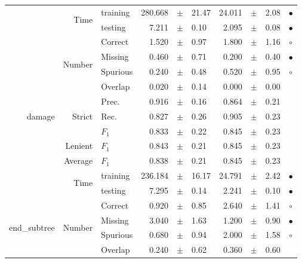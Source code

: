 \begin{longtable}{|r|r|l||rcl|rcl|c|}
\cline{2-10}
 & \multirow{2}{*}{Time} &  training  & 280.668 &  $\pm$  & 21.47 & 24.011 &  $\pm$  & 2.08 &  $\bullet$\\
\cline{3-10}
 &  &  testing  & 7.211 &  $\pm$  & 0.10 & 2.095 &  $\pm$  & 0.08 &  $\bullet$\\
\hline
\hline
\multirow{11}{*}{\begin{sideways}damage\end{sideways} } & \multirow{4}{*}{Number} &  Correct  & 1.520 &  $\pm$  & 0.97 & 1.800 &  $\pm$  & 1.16 &  $\circ$\\
\cline{3-10}
  &  &  Missing  & 0.460 &  $\pm$  & 0.71 & 0.200 &  $\pm$  & 0.40 &  $\bullet$\\
\cline{3-10}
  &  &  Spurious  & 0.240 &  $\pm$  & 0.48 & 0.520 &  $\pm$  & 0.95 &  $\circ$\\
\cline{3-10}
  &  &  Overlap  & 0.020 &  $\pm$  & 0.14 & 0.000 &  $\pm$  & 0.00 &   \\
\cline{2-10}
  & \multirow{3}{*}{Strict} &  Prec.  & 0.916 &  $\pm$  & 0.16 & 0.864 &  $\pm$  & 0.21 &   \\
\cline{3-10}
  &  &  Rec.  & 0.827 &  $\pm$  & 0.26 & 0.905 &  $\pm$  & 0.23 &   \\
\cline{3-10}
  &  &  $F_1$  & 0.833 &  $\pm$  & 0.22 & 0.845 &  $\pm$  & 0.23 &   \\
\cline{2-10}
  & Lenient &  $F_1$  & 0.843 &  $\pm$  & 0.21 & 0.845 &  $\pm$  & 0.23 &   \\
\cline{2-10}
  & Average &  $F_1$  & 0.838 &  $\pm$  & 0.21 & 0.845 &  $\pm$  & 0.23 &   \\
\cline{2-10}
  & \multirow{2}{*}{Time} &  training  & 236.184 &  $\pm$  & 16.17 & 24.791 &  $\pm$  & 2.42 &  $\bullet$\\
\cline{3-10}
  &  &  testing  & 7.295 &  $\pm$  & 0.14 & 2.241 &  $\pm$  & 0.10 &  $\bullet$\\
\hline
\hline
\multirow{11}{*}{\begin{sideways}end\_subtree\end{sideways} } & \multirow{4}{*}{Number} &  Correct  & 0.920 &  $\pm$  & 0.85 & 2.640 &  $\pm$  & 1.41 &  $\circ$\\
\cline{3-10}
  &  &  Missing  & 3.040 &  $\pm$  & 1.63 & 1.200 &  $\pm$  & 0.90 &  $\bullet$\\
\cline{3-10}
  &  &  Spurious  & 0.680 &  $\pm$  & 0.94 & 2.000 &  $\pm$  & 1.58 &  $\circ$\\
\cline{3-10}
  &  &  Overlap  & 0.240 &  $\pm$  & 0.62 & 0.360 &  $\pm$  & 0.60 &   \\

\end{longtable}
